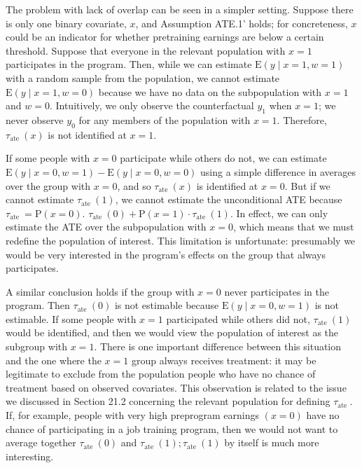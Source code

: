 \documentclass[10pt]{article}
\begin{document}
The problem with lack of overlap can be seen in a simpler setting. Suppose there is only one binary covariate, $x$, and Assumption ATE.1' holds; for concreteness, $x$ could be an indicator for whether pretraining earnings are below a certain threshold. Suppose that everyone in the relevant population with $x=1$ participates in the program. Then, while we can estimate $\mathrm{E}(y \mid x=1, w=1)$ with a random sample from the population, we cannot estimate $\mathrm{E}(y \mid x=1, w=0)$ because we have no data on the subpopulation with $x=1$ and $w=0$. Intuitively, we only observe the counterfactual $y_{1}$ when $x=1$; we never observe $y_{0}$ for any members of the population with $x=1$. Therefore, $\tau_{\text {ate }}(x)$ is not identified at $x=1$.

If some people with $x=0$ participate while others do not, we can estimate $\mathrm{E}(y \mid x=0, w=1)-\mathrm{E}(y \mid x=0, w=0)$ using a simple difference in averages over the group with $x=0$, and so $\tau_{\text {ate }}(x)$ is identified at $x=0$. But if we cannot estimate $\tau_{\text {ate }}(1)$, we cannot estimate the unconditional ATE because $\tau_{\text {ate }}=\mathrm{P}(x=0)$. $\tau_{\text {ate }}(0)+\mathrm{P}(x=1) \cdot \tau_{\text {ate }}(1)$. In effect, we can only estimate the ATE over the subpopulation with $x=0$, which means that we must redefine the population of interest. This limitation is unfortunate: presumably we would be very interested in the program's effects on the group that always participates.

A similar conclusion holds if the group with $x=0$ never participates in the program. Then $\tau_{\text {ate }}(0)$ is not estimable because $\mathrm{E}(y \mid x=0, w=1)$ is not estimable. If some people with $x=1$ participated while others did not, $\tau_{\text {ate }}(1)$ would be identified, and then we would view the population of interest as the subgroup with $x=1$. There is one important difference between this situation and the one where the $x=1$ group always receives treatment: it may be legitimate to exclude from the population people who have no chance of treatment based on observed covariates. This observation is related to the issue we discussed in Section 21.2 concerning the relevant population for defining $\tau_{\text {ate }}$. If, for example, people with very high preprogram earnings $(x=0)$ have no chance of participating in a job training program, then we would not want to average together $\tau_{\text {ate }}(0)$ and $\tau_{\text {ate }}(1) ; \tau_{\text {ate }}(1)$ by itself is much more interesting.
\end{document}
